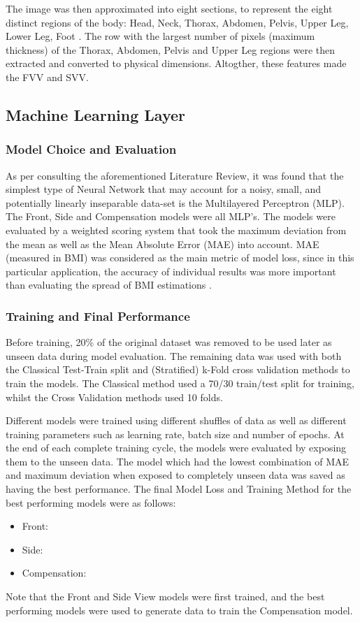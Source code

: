 \documentclass[conference]{IEEEtran}
\begin{document}
The image was then approximated into eight sections, to represent the eight distinct regions of the body: Head, Neck, Thorax, Abdomen, Pelvis, Upper Leg, Lower Leg, Foot \cite{bodyproportions}.
The row with the largest number of pixels (maximum thickness) of the Thorax, Abdomen, Pelvis and Upper Leg regions were then extracted and converted to physical dimensions.
Altogther, these features made the FVV and SVV.

\subsection{Machine Learning Layer}
\subsubsection{Model Choice and Evaluation}
As per consulting the aforementioned Literature Review, it was found that the simplest type of Neural Network that may account for a noisy, small, and potentially linearly inseparable data-set is the Multilayered Perceptron (MLP).
The Front, Side and Compensation models were all MLP's.
The models were evaluated by a weighted scoring system that took the maximum deviation from the mean as well as the Mean Absolute Error (MAE) into account.
MAE (measured in BMI) was considered as the main metric of model loss, since in this particular application, the accuracy of individual results was more important than evaluating the spread of BMI estimations \cite{bmifromface}.

\subsubsection{Training and Final Performance}
Before training, 20\% of the original dataset was removed to be used later as unseen data during model evaluation.
The remaining data was used with both the Classical Test-Train split and (Stratified) k-Fold cross validation methods to train the models.
The Classical method used a 70/30 train/test split for training, whilst the Cross Validation methods used 10 folds.

Different models were trained using different shuffles of data as well as different training parameters such as learning rate, batch size and number of epochs.
At the end of each complete training cycle, the models were evaluated by exposing them to the unseen data.
The model which had the lowest combination of MAE and maximum deviation when exposed to completely unseen data was saved as having the best performance.
The final Model Loss and Training Method for the best performing models were as follows:
\begin{itemize}
	\item Front:
	\item Side:
	\item Compensation:
\end{itemize}
Note that the Front and Side View models were first trained, and the best performing models were used to generate data to train the Compensation model.
\end{document}
